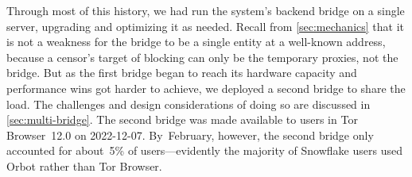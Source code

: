 \documentclass[letterpaper,twocolumn]{article}
\begin{document}
Through most of this history,
we had run the system's backend bridge on a single server,
upgrading and optimizing it as needed.
Recall from \autoref{sec:mechanics} that it is not a weakness
for the bridge to be a single entity at a well-known address,
because a censor's target of blocking can only be the temporary proxies, not the bridge.
But as the first bridge began to reach its hardware capacity
and performance wins got harder to achieve,
we deployed a second bridge to share the load.
The challenges and design considerations of doing so are discussed in \autoref{sec:multi-bridge}.
The second bridge was made available to users in
Tor Browser~12.0 on \mbox{2022-12-07}.
By~February, however, the second bridge only accounted for about~5\%
of users---evidently the majority of Snowflake users used Orbot
rather than Tor Browser.
\end{document}

